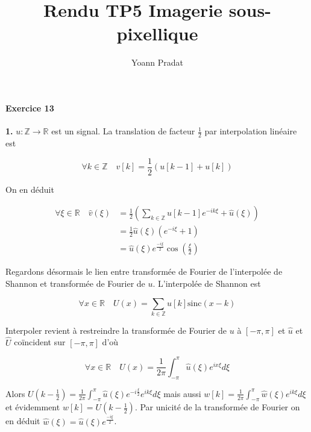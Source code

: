 \documentclass[a4paper, 11pt]{article}
\begin{document}
\title{Rendu TP5 Imagerie sous-pixellique}
\author{Yoann Pradat}
\maketitle

\paragraph{Exercice 13}

\textbf{1.} $u: \mathbb{Z} \to \mathbb{R}$ est un signal. La translation de facteur $\frac{1}{2}$ par interpolation
linéaire est 

\begin{equation}
  \forall k \in \mathbb{Z} \quad v[k] = \frac{1}{2}(u[k-1] + u[k])
\end{equation}

On en déduit

\begin{align*}
  \forall \xi \in \mathbb{R} \quad \hat{v}(\xi) &= \frac{1}{2} ( \sum_{k \in \mathbb{Z}} u[k-1] e^{-ik\xi} + \hat{u}(\xi))\\
  &= \frac{1}{2}\hat{u}(\xi) (e^{-i\xi} + 1) \\
  &= \hat{u}(\xi) e^{\frac{-i\xi}{2}} \cos(\frac{\xi}{2}) 
\end{align*}

Regardons désormais le lien entre transformée de Fourier de l'interpolée de Shannon et transformée de Fourier de $u$.
L'interpolée de Shannon est 

\begin{equation}
  \forall x \in \mathbb{R} \quad U(x) = \sum_{k \in \mathbb{Z}} u[k] \text{sinc}(x-k)
\end{equation}

Interpoler revient à restreindre la transformée de Fourier de $u$ à $[-\pi, \pi]$ et $\hat{u}$ et $\hat{U}$ coïncident
sur $[-\pi, \pi]$ d'où

\begin{equation*}
  \forall x \in \mathbb{R} \quad U(x) = \frac{1}{2\pi} \int_{-\pi}^{\pi} \hat{u}(\xi) e^{ix\xi} d\xi
\end{equation*}

Alors $\displaystyle U(k-\frac{1}{2}) =  \frac{1}{2\pi} \int_{-\pi}^{\pi} \hat{u}(\xi) e^{-i\frac{\xi}{2}} e^{ik\xi}
d\xi$ mais aussi  $\displaystyle w[k] = \frac{1}{2\pi} \int_{-\pi}^{\pi} \hat{w}(\xi) e^{ik\xi} d\xi$ et évidemment $w[k] =
U(k-\frac{1}{2})$. Par unicité de la transformée de Fourier on en déduit $\hat{w}(\xi) = \hat{u}(\xi)
e^{\frac{-i\xi}{2}}$. \\
\end{document}
